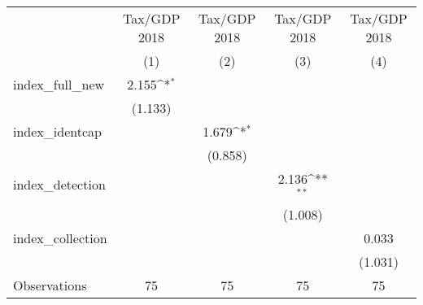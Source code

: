 {
\def\sym#1{\ifmmode^{#1}\else\(^{#1}\)\fi}
\begin{tabular}{l*{4}{c}}
\hline\hline
                &\multicolumn{1}{c}{Tax/GDP 2018}&\multicolumn{1}{c}{Tax/GDP 2018}&\multicolumn{1}{c}{Tax/GDP 2018}&\multicolumn{1}{c}{Tax/GDP 2018}\\
                &\multicolumn{1}{c}{(1)}         &\multicolumn{1}{c}{(2)}         &\multicolumn{1}{c}{(3)}         &\multicolumn{1}{c}{(4)}         \\
\hline
index\_full\_new  &    2.155\sym{*}  &                  &                  &                  \\
                &  (1.133)         &                  &                  &                  \\
index\_identcap  &                  &    1.679\sym{*}  &                  &                  \\
                &                  &  (0.858)         &                  &                  \\
index\_detection &                  &                  &    2.136\sym{**} &                  \\
                &                  &                  &  (1.008)         &                  \\
index\_collection&                  &                  &                  &    0.033         \\
                &                  &                  &                  &  (1.031)         \\
\hline
Observations    &       75         &       75         &       75         &       75         \\
\hline\hline
\end{tabular}
}
